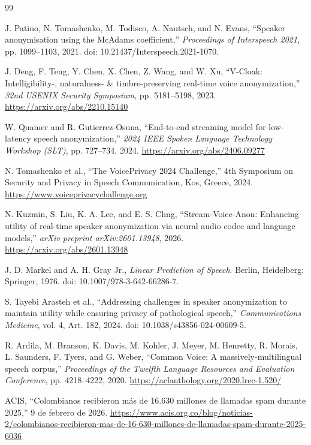 \documentclass[10pt,twocolumn]{article}
\begin{document}
\begin{thebibliography}{99}

J. Patino, N. Tomashenko, M. Todisco, A. Nautsch, and N. Evans,
``Speaker anonymisation using the McAdams coefficient,''
\textit{Proceedings of Interspeech 2021},
pp. 1099--1103, 2021.
doi: 10.21437/Interspeech.2021-1070.

J. Deng, F. Teng, Y. Chen, X. Chen, Z. Wang, and W. Xu,
``V-Cloak: Intelligibility-, naturalness- \& timbre-preserving real-time
voice anonymization,''
\textit{32nd USENIX Security Symposium},
pp. 5181--5198, 2023.
\url{https://arxiv.org/abs/2210.15140}

W. Quamer and R. Gutierrez-Osuna,
``End-to-end streaming model for low-latency speech anonymization,''
\textit{2024 IEEE Spoken Language Technology Workshop (SLT)},
pp. 727--734, 2024.
\url{https://arxiv.org/abs/2406.09277}

N. Tomashenko et al.,
``The VoicePrivacy 2024 Challenge,''
4th Symposium on Security and Privacy in Speech Communication,
Kos, Greece, 2024.
\url{https://www.voiceprivacychallenge.org}

N. Kuzmin, S. Liu, K. A. Lee, and E. S. Chng,
``Stream-Voice-Anon: Enhancing utility of real-time speaker anonymization
via neural audio codec and language models,''
\textit{arXiv preprint arXiv:2601.13948}, 2026.
\url{https://arxiv.org/abs/2601.13948}

J. D. Markel and A. H. Gray Jr.,
\textit{Linear Prediction of Speech}.
Berlin, Heidelberg: Springer, 1976.
doi: 10.1007/978-3-642-66286-7.

S. Tayebi Arasteh et al.,
``Addressing challenges in speaker anonymization to maintain utility while
ensuring privacy of pathological speech,''
\textit{Communications Medicine},
vol. 4, Art. 182, 2024.
doi: 10.1038/s43856-024-00609-5.

R. Ardila, M. Branson, K. Davis, M. Kohler, J. Meyer, M. Henretty,
R. Morais, L. Saunders, F. Tyers, and G. Weber,
``Common Voice: A massively-multilingual speech corpus,''
\textit{Proceedings of the Twelfth Language Resources and Evaluation
Conference},
pp. 4218--4222, 2020.
\url{https://aclanthology.org/2020.lrec-1.520/}

ACIS,
``Colombianos recibieron más de 16.630 millones de llamadas spam durante
2025,''
9 de febrero de 2026.
\url{https://www.acis.org.co/blog/noticias-2/colombianos-recibieron-mas-de-16-630-millones-de-llamadas-spam-durante-2025-6036}


\end{thebibliography}
\end{document}
